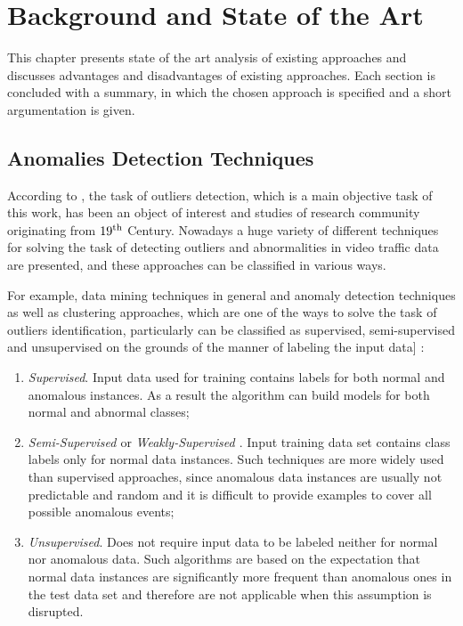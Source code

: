 \chapter{Background and State of the Art}
\label{ch:Background and State of the Art}

This chapter presents state of the art analysis of existing approaches and discusses advantages and disadvantages of existing approaches. Each section is concluded with a summary, in which the chosen approach is specified and a short argumentation is given.

\section{Anomalies Detection Techniques}
According to \cite{article:15_survey_ad}, the task of outliers detection, which is a main objective task of this work, has been an object of interest and studies of research community originating from $19\textsuperscript{th}$ Century. Nowadays a huge variety of different techniques for solving the task of detecting outliers and abnormalities in video traffic data are presented, and these approaches can be classified in various ways.

For example, data mining techniques in general and anomaly detection techniques as well as clustering approaches, which are one of the ways to solve the task of outliers identification, particularly can be classified as supervised, semi-supervised and unsupervised on the grounds of the manner of labeling the input data] \cite{article:15_survey_ad}\cite{article:comp_analys_odt}:
\begin{enumerate}
	\item \textit{Supervised}. Input data used for training contains labels for both normal and anomalous instances. As a result the algorithm can build models for both normal and abnormal classes;
	\item \textit{Semi-Supervised \cite{article:15_survey_ad}} or \textit{Weakly-Supervised \cite{article:5_survey_tbsa}}. Input training data set contains class labels only for normal data instances. Such techniques are more widely used than supervised approaches, since anomalous data instances are usually not predictable and random and it is difficult to provide examples to cover all possible anomalous events;
	\item \textit{Unsupervised}. Does not require input data to be labeled neither for normal nor anomalous data. Such algorithms are based on the expectation that normal data instances are significantly more frequent than anomalous ones in the test data set and therefore are not applicable when this assumption is disrupted.
\end{enumerate}

